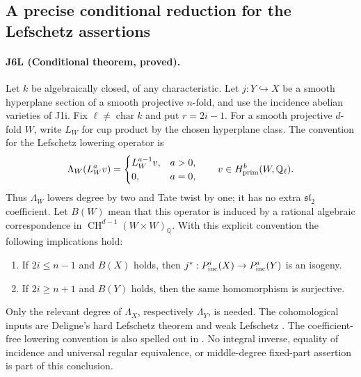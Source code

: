 \subsection{A precise conditional reduction for the Lefschetz assertions}
\paragraph{J6L (Conditional theorem, proved).}
Let $k$ be algebraically closed, of any characteristic. Let
$j:Y\hookrightarrow X$ be a smooth hyperplane section of a smooth
projective $n$-fold, and use the incidence abelian varieties of J1i.
Fix $\ell\ne\operatorname{char}k$ and put $r=2i-1$. For a smooth
projective $d$-fold $W$, write $L_W$ for cup product by the chosen
hyperplane class. The convention for the Lefschetz lowering
operator is
\[
 \Lambda_W(L_W^a v)=
 \begin{cases}L_W^{a-1}v,&a>0,\\0,&a=0,\end{cases}
 \qquad v\in H^b_{\rm prim}(W,\mathbb Q_\ell).
\]
Thus $\Lambda_W$ lowers degree by two and Tate twist by one; it
has no extra $\mathfrak{sl}_2$ coefficient. Let $B(W)$ mean that
this operator is induced by a rational algebraic correspondence
in $\operatorname{CH}^{d-1}(W\times W)_{\mathbb Q}$.
With this explicit convention the following implications hold:
\begin{enumerate}
\item If $2i\leq n-1$ and $B(X)$ holds, then
$j^*:P^i_{\rm inc}(X)\to P^i_{\rm inc}(Y)$ is an isogeny.
\item If $2i\geq n+1$ and $B(Y)$ holds, then the same homomorphism
is surjective.
\end{enumerate}
Only the relevant degree of $\Lambda_X$, respectively
$\Lambda_Y$, is needed. The cohomological inputs are Deligne's hard Lefschetz theorem
\cite[Theorem 4.1.1, p.~217]{DGJ_Deligne1980} and weak
Lefschetz \cite[(4.1.6), pp.~218--219]{DGJ_Deligne1980}.
The coefficient-free lowering convention is also spelled out in
\cite[Section 4.1, pp.~6--7]{DGJ_Peters2026}.
No integral inverse, equality of
incidence and universal regular equivalence, or middle-degree
fixed-part assertion is part of this conclusion.


